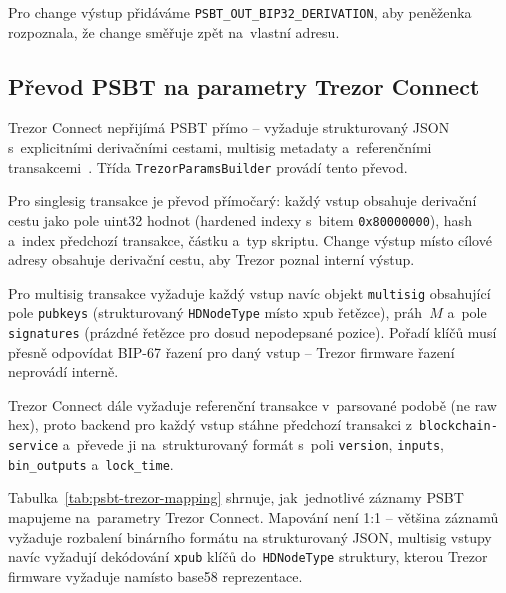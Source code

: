 \noindent Pro change výstup přidáváme \texttt{PSBT\_OUT\_BIP32\_DERIVATION},
aby peněženka rozpoznala, že change směřuje zpět na~vlastní adresu.

\subsection{Převod PSBT na parametry Trezor Connect}

Trezor Connect nepřijímá PSBT přímo -- vyžaduje strukturovaný JSON
s~explicitními derivačními cestami, multisig metadaty a~referenčními
transakcemi~\cite{TrezorConnect,TrezorFirmwareDocs}. Třída
\texttt{TrezorParamsBuilder} provádí tento převod.

Pro singlesig transakce je převod přímočarý: každý vstup obsahuje
derivační cestu jako pole uint32 hodnot (hardened indexy s~bitem
\texttt{0x80000000}), hash a~index předchozí transakce, částku a~typ
skriptu. Change výstup místo cílové adresy obsahuje derivační cestu,
aby Trezor poznal interní výstup.

Pro multisig transakce vyžaduje každý vstup navíc objekt \texttt{multisig}
obsahující pole \texttt{pubkeys} (strukturovaný \texttt{HDNodeType} místo
xpub řetězce), práh~$M$ a~pole \texttt{signatures} (prázdné řetězce pro
dosud nepodepsané pozice). Pořadí klíčů musí přesně odpovídat BIP-67
řazení pro daný vstup -- Trezor firmware řazení neprovádí interně.

Trezor Connect dále vyžaduje referenční transakce v~parsované podobě
(ne raw hex), proto backend pro každý vstup stáhne předchozí
transakci z~\texttt{blockchain-\allowbreak service} a~převede ji
na~strukturovaný formát s~poli \texttt{version}, \texttt{inputs},
\texttt{bin\_\allowbreak outputs} a~\texttt{lock\_\allowbreak time}.

Tabulka~\ref{tab:psbt-trezor-mapping} shrnuje, jak~jednotlivé záznamy
PSBT mapujeme na~parametry Trezor Connect. Mapování není 1:1 -- většina
záznamů vyžaduje rozbalení binárního formátu na strukturovaný JSON,
multisig vstupy navíc vyžadují dekódování \texttt{xpub} klíčů
do~\texttt{HDNodeType} struktury, kterou Trezor firmware vyžaduje
namísto base58 reprezentace.

